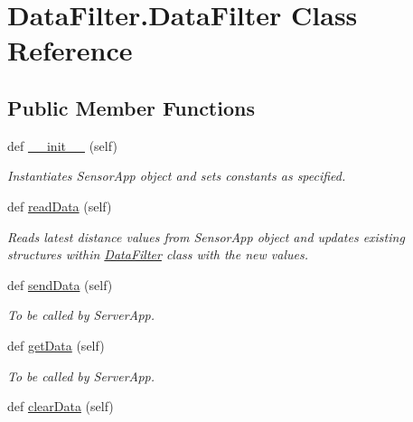 \hypertarget{class_data_filter_1_1_data_filter}{}\section{Data\+Filter.\+Data\+Filter Class Reference}
\label{class_data_filter_1_1_data_filter}
\subsection*{Public Member Functions}
\begin{DoxyCompactItemize}
\item 
def \mbox{\hyperlink{class_data_filter_1_1_data_filter_ac410f2a7e9574299ee6aff0aff11d3a9}{\+\_\+\+\_\+init\+\_\+\+\_\+}} (self)
\begin{DoxyCompactList}\small\item\em Instantiates Sensor\+App object and sets constants as specified. \end{DoxyCompactList}\item 
\mbox{\label{class_data_filter_1_1_data_filter_a57a96ca7f581852e2922be99f48578e5}} 
def \mbox{\hyperlink{class_data_filter_1_1_data_filter_a57a96ca7f581852e2922be99f48578e5}{read\+Data}} (self)
\begin{DoxyCompactList}\small\item\em Reads latest distance values from Sensor\+App object and updates existing structures within \mbox{\hyperlink{class_data_filter_1_1_data_filter}{Data\+Filter}} class with the new values. \end{DoxyCompactList}\item 
def \mbox{\hyperlink{class_data_filter_1_1_data_filter_a8ce1d7743127e462a018d678d5e44927}{send\+Data}} (self)
\begin{DoxyCompactList}\small\item\em To be called by Server\+App. \end{DoxyCompactList}\item 
def \mbox{\hyperlink{class_data_filter_1_1_data_filter_ae58c36c4343d52baf699c2ce68fbb784}{get\+Data}} (self)
\begin{DoxyCompactList}\small\item\em To be called by Server\+App. \end{DoxyCompactList}\item 
def \mbox{\hyperlink{class_data_filter_1_1_data_filter_a2b121b53a52353af961ce977449e4bfa}{clear\+Data}} (self)

\end{DoxyCompactItemize}

